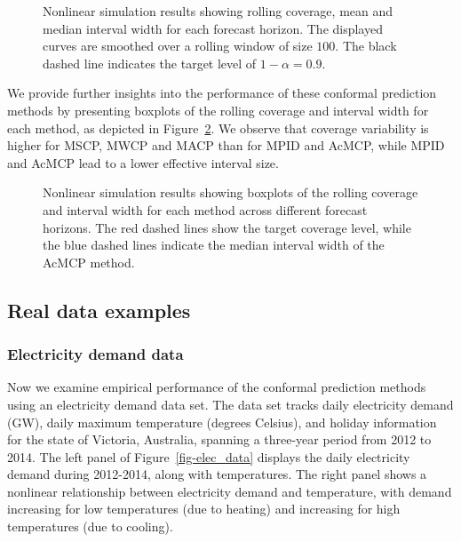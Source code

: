 \documentclass[
  11pt,
  a4paper,
]{article}
\theoremstyle{plain}
\theoremstyle{remark}
\begin{document}
\begin{figure}


\caption{\label{fig-NL_cov}Nonlinear simulation results showing rolling
coverage, mean and median interval width for each forecast horizon. The
displayed curves are smoothed over a rolling window of size \(100\). The
black dashed line indicates the target level of \(1-\alpha=0.9\).}

\end{figure}%

We provide further insights into the performance of these conformal
prediction methods by presenting boxplots of the rolling coverage and
interval width for each method, as depicted in Figure~\ref{fig-NL_box}.
We observe that coverage variability is higher for MSCP, MWCP and MACP
than for MPID and AcMCP, while MPID and AcMCP lead to a lower effective
interval size.

\begin{figure}


\caption{\label{fig-NL_box}Nonlinear simulation results showing boxplots
of the rolling coverage and interval width for each method across
different forecast horizons. The red dashed lines show the target
coverage level, while the blue dashed lines indicate the median interval
width of the AcMCP method.}

\end{figure}%

\subsection{Real data examples}\label{real-data-examples}

\subsubsection{Electricity demand data}\label{electricity-demand-data}

Now we examine empirical performance of the conformal prediction methods
using an electricity demand data set. The data set tracks daily
electricity demand (GW), daily maximum temperature (degrees Celsius),
and holiday information for the state of Victoria, Australia, spanning a
three-year period from 2012 to 2014. The left panel of
Figure~\ref{fig-elec_data} displays the daily electricity demand during
2012-2014, along with temperatures. The right panel shows a nonlinear
relationship between electricity demand and temperature, with demand
increasing for low temperatures (due to heating) and increasing for high
temperatures (due to cooling).
\end{document}
